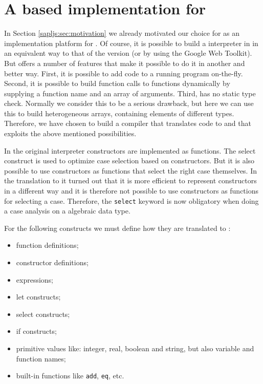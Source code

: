 \section{A \JS based implementation for  \Sapl}\label{sapljs:sec:sapljs}
In Section \ref{sapljs:sec:motivation} we already motivated our choice for \JS as an implementation platform for \Sapl.
Of course, it is possible to build a \Sapl interpreter in \JS in an equivalent way to that of the \Java version (or by using the Google Web Toolkit).
But \JS offers a number of features that make it possible to do it in another and better way.
First, it is possible to add \JS code to a running \JS program on-the-fly.
Second, it is possible to build function calls to \JS functions dynamically by supplying a function name and an array of arguments.
Third, \JS has no static type check. Normally we consider this to be a serious drawback, but here we can use this to build heterogeneous arrays,
containing elements of different types.
Therefore, we have chosen to build a compiler that translates \Sapl code to \JS and that exploits the above mentioned possibilities.

In the original \Sapl interpreter constructors are implemented as functions.
The \textsf{select} construct is used to optimize case selection based on constructors.
But it is also possible to use constructors as functions that select the right case themselves.
In the translation to \JS it turned out that it is more efficient to represent constructors in 
a different way and it is therefore not possible to use constructors as functions for selecting a case. 
Therefore, the \texttt{select} keyword is now obligatory when doing a case analysis on a algebraic data type.

For the following \Sapl constructs we must define how they are translated to \JS:
\begin{itemize}
	\item function definitions;
	\item constructor definitions;
	\item expressions;
	\item let constructs;
	\item select constructs;
	\item if constructs;
	\item primitive values like: integer, real, boolean and string, but also variable and function names;
	\item built-in functions like \texttt{add}, \texttt{eq}, etc.
\end{itemize}

